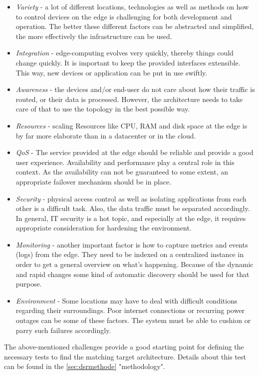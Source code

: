 \documentclass[MIC,Master,english]{twbook}%
\begin{document}
\begin{itemize}
    \item \textit{Variety} - a lot of different locations, technologies as well as methods on how to control devices on the edge is challenging for both development and operation. The better these different factors can be abstracted and simplified, the more effectively the infrastructure can be used.
    \item \textit{Integration} - edge-computing evolves very quickly, thereby things could change quickly. It is important to keep the provided interfaces extensible. This way, new devices or application can be put in use swiftly. 
    \item \textit{Awareness} - the devices and/or end-user do not care about how their traffic is routed, or their data is processed. However, the architecture needs to take care of that to use the topology in the best possible way.
    \item \textit{Resources} - scaling Resources like \ac{CPU}, \ac{RAM} and disk space at the edge is by far more elaborate than in a datacenter or in the cloud.
    \item \textit{\ac{QoS}} - The service provided at the edge should be reliable and provide a good user experience. Availability and performance play a central role in this context. As the availability can not be guaranteed to some extent, an appropriate failover mechanism should be in place.
    \item \textit{Security} - physical access control as well as isolating applications from each other is a difficult task. Also, the data traffic must be separated accordingly. In general, \ac{IT} security is a hot topic, and especially at the edge, it requires appropriate consideration for hardening the environment.
    \item \textit{Monitoring} - another important factor is how to capture metrics and events (logs) from the edge. They need to be indexed on a centralized instance in order to get a general overview on what's happening. Because of the dynamic and rapid changes some kind of automatic discovery should be used for that purpose.
    \item \textit{Environment} - Some locations may have to deal with difficult conditions regarding their surroundings. Poor internet connections or recurring power outages can be some of these factors. The system must be able to cushion or parry such failures accordingly.
\end{itemize}
The above-mentioned challenges provide a good starting point for defining the necessary tests to find the matching target architecture. Details about this test can be found in the \autoref{sec:dsrmethode} "methodology".
\end{document}
